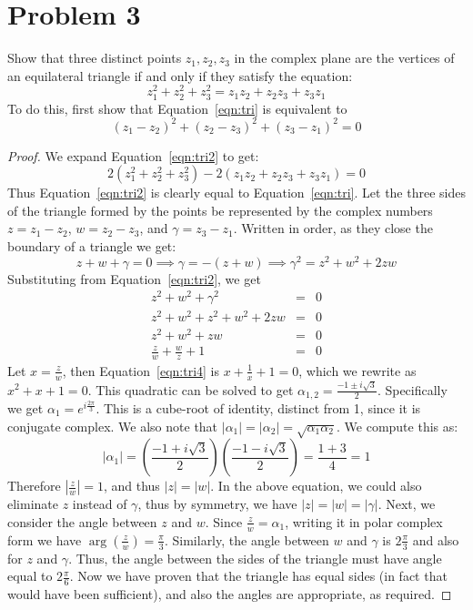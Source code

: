 \documentclass{article}[12pt]
\newtheorem{proof}{Proof}
\begin{document}
\section{Problem 3} 
Show that three distinct points $z_1,z_2,z_3$ in the complex plane
are the vertices of an equilateral triangle if and only if they
satisfy the equation:
\begin{equation}
z_1^2 + z_2^2 + z_3^2 = z_1z_2 + z_2z_3 + z_3z_1 \label{eqn:tri}
\end{equation}
To do this, first show that Equation~\ref{eqn:tri} is equivalent to
\begin{equation}
(z_1-z_2)^2 + (z_2-z_3)^2 + (z_3-z_1)^2 = 0 \label{eqn:tri2}
\end{equation}
\begin{proof}
We expand Equation~\ref{eqn:tri2} to get:
\[
2(z_1^2 + z_2^2 + z_3^2) - 2(z_1z_2 + z_2z_3 + z_3z_1)=0 \label{eqn:tri3}
\]
Thus Equation~\ref{eqn:tri2} is clearly equal to Equation~\ref{eqn:tri}.
Let the three sides of the triangle formed by the points be
represented by the complex numbers $z=z_1-z_2$, $w=z_2-z_3$, and
$\gamma=z_3-z_1$. Written in order, as they close the boundary of
a triangle we get:
\[
z+w+\gamma=0 \implies \gamma= -(z+w) \implies \gamma^2 = z^2+w^2+2zw
\]
Substituting from Equation~\ref{eqn:tri2}, we get
\begin{eqnarray}
z^2 + w^2 + \gamma^2 & = & 0  \\
z^2 + w^2 + z^2 + w^2 + 2zw & = & 0 \\
z^2 + w^2 + zw & = & 0 \\
\frac{z}{w} + \frac{w}{z} + 1 & = & 0 \label{eqn:tri4}
\end{eqnarray}
Let $x=\frac{z}{w}$, then Equation~\ref{eqn:tri4} is $x+\frac{1}{x}+1=0$,
which we rewrite as $x^2+x+1=0$. This quadratic can be solved to get
$\alpha_{1,2}=\frac{-1\pm i\sqrt{3}}{2}$. Specifically we get
$\alpha_1=e^{i\frac{2\pi}{3}}$. 
This is a cube-root of identity,
distinct from 1, since it is conjugate complex. We also note that
$|\alpha_1|=|\alpha_2|=\sqrt{\alpha_1\alpha_2}$. We compute this as:
\[
|\alpha_1| = (\frac{-1+i\sqrt{3}}{2})(\frac{-1-i\sqrt{3}}{2})
= \frac{1+3}{4} = 1
\]
Therefore $|\frac{z}{w}|=1$, and thus $|z|=|w|$.
In the above equation, we could also eliminate $z$ instead of $\gamma$, thus
by symmetry, we have $|z|=|w|=|\gamma|$. Next, we consider the angle between
$z$ and $w$. Since $\frac{z}{w}=\alpha_1$, writing it in polar complex form
we have $\arg(\frac{z}{w})=\frac{\pi}{3}$. Similarly, the angle between
$w$ and $\gamma$ is $2\frac{\pi}{3}$ and also for $z$ and $\gamma$. Thus, 
the angle between the sides of the triangle must have angle equal to 
$2\frac{\pi}{6}$. Now we have proven that the triangle has equal sides (in
fact that would have been sufficient), and also the angles are appropriate,
as required.
\end{proof}
\end{document}

